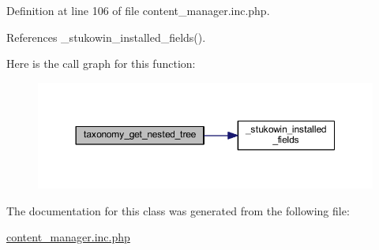 Definition at line 106 of file content\+\_\+manager.\+inc.\+php.



References \+\_\+stukowin\+\_\+installed\+\_\+fields().



Here is the call graph for this function\+:
\nopagebreak
\begin{figure}[H]
\begin{center}
\leavevmode
\includegraphics[width=350pt]{classcontent__manager_acfeb4c387a22e750487e1bee5c73c1f9_cgraph}
\end{center}
\end{figure}




The documentation for this class was generated from the following file\+:\begin{DoxyCompactItemize}
\item 
\hyperlink{content__manager_8inc_8php}{content\+\_\+manager.\+inc.\+php}\end{DoxyCompactItemize}
